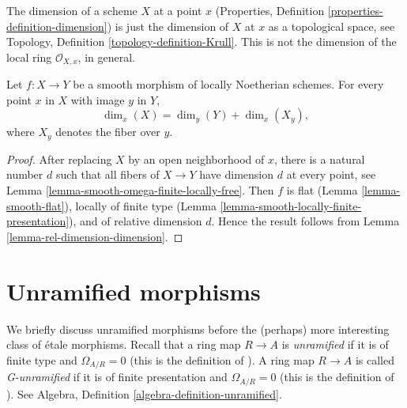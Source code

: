 \noindent
The dimension of a scheme $X$ at a point $x$
(Properties, Definition \ref{properties-definition-dimension})
is just the dimension of $X$ at $x$ as a topological space, see
Topology, Definition \ref{topology-definition-Krull}.
This is not the dimension of the local ring $\mathcal{O}_{X,x}$, in general.

\begin{lemma}
\label{lemma-smoothness-dimension}
Let $f : X \to Y$ be a smooth morphism of locally Noetherian schemes.
For every point $x$ in $X$ with image $y$ in $Y$,
$$
\dim_x(X) = \dim_y(Y) + \dim_x(X_y),
$$
where $X_y$ denotes the fiber over $y$.
\end{lemma}

\begin{proof}
After replacing $X$ by an open neighborhood of $x$,
there is a natural number $d$ such that all fibers
of $X \to Y$ have dimension $d$ at every point, see
Lemma \ref{lemma-smooth-omega-finite-locally-free}.
Then $f$ is flat (Lemma \ref{lemma-smooth-flat}),
locally of finite type (Lemma \ref{lemma-smooth-locally-finite-presentation}),
and of relative dimension $d$. Hence the result follows from
Lemma \ref{lemma-rel-dimension-dimension}.
\end{proof}












\section{Unramified morphisms}
\label{section-unramified}

\noindent
We briefly discuss unramified morphisms before the (perhaps) more interesting
class of \'etale morphisms. Recall that a ring map $R \to A$ is {\it unramified}
if it is of finite type and $\Omega_{A/R} = 0$ (this is the definition
of \cite{Henselian}). A ring map $R \to A$ is called {\it G-unramified} if it
is of finite presentation and $\Omega_{A/R} = 0$ (this is the definition of
\cite{EGA}). See
Algebra, Definition \ref{algebra-definition-unramified}.

